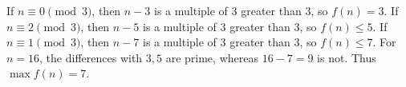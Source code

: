 If $n\equiv0\pmod3$, then $n-3$ is a multiple of $3$ greater than $3$, so $f(n)=3$. If $n\equiv2\pmod3$, then $n-5$ is a multiple of $3$ greater than $3$, so $f(n)\le5$. If $n\equiv1\pmod3$, then $n-7$ is a multiple of $3$ greater than $3$, so $f(n)\le7$. For $n=16$, the differences with $3,5$ are prime, whereas $16-7=9$ is not. Thus $\boxed{\max f(n)=7}$.
